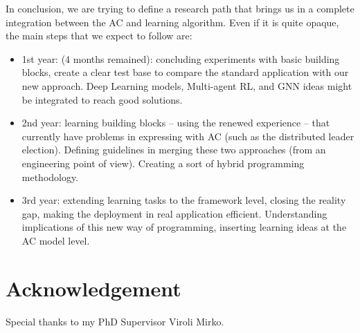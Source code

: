 \documentclass[conference]{IEEEtran}
\begin{document}
In conclusion, we are trying to define a research path that brings us in a complete integration between the AC and learning algorithm. Even if it is quite opaque, the main steps that we expect to follow are:
\begin{itemize}
    \item 1st year: (4 months remained): concluding experiments with basic building blocks, create a clear test base to compare the standard application with our new approach. Deep Learning models, Multi-agent RL, and GNN ideas might be integrated to reach good solutions.
    \item 2nd year: learning building blocks -- using the renewed experience -- that currently have problems in expressing with AC (such as the distributed leader election).
    Defining guidelines in merging these two approaches (from an engineering point of view). Creating a sort of hybrid programming methodology.
    \item 3rd year: extending learning tasks to the framework level, closing the reality gap, making the deployment in real application efficient. Understanding implications of this new way of programming, inserting learning ideas at the AC model level. 
\end{itemize}
\section*{Acknowledgement}
Special thanks to my PhD Supervisor Viroli Mirko.


\end{document}
